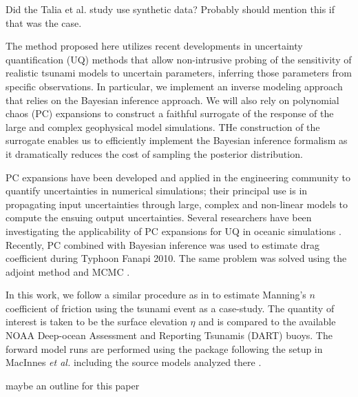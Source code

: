\alert{Did the Talia et al. study use synthetic data?  Probably should mention
this if that was the case.}

The method proposed here utilizes recent developments in uncertainty
quantification (UQ) methods that allow non-intrusive probing of the sensitivity
of realistic tsunami  models to uncertain parameters, inferring those parameters
from specific  observations.  In particular, we implement an inverse modeling
approach that relies on the Bayesian inference approach.  We will also rely on
polynomial chaos (PC) expansions to construct a faithful surrogate of the
response of the large and complex geophysical model simulations.  THe
construction of the surrogate enables us to efficiently implement the Bayesian
inference formalism as it dramatically reduces the cost of sampling the
posterior distribution.

PC expansions have been developed and applied in the engineering community to
quantify uncertainties in numerical simulations; their principal use is in
propagating input uncertainties through large, complex and non-linear models to
compute the ensuing output uncertainties. Several researchers have been
investigating the applicability of PC expansions for UQ in oceanic simulations
\citep{thacker2012,ashwanth2010,Alexanderian2012}. Recently, PC combined with
Bayesian inference was used to estimate drag coefficient during Typhoon Fanapi
2010. The same problem was solved using the adjoint method and MCMC
\cite{sraj:2013a,sraj:2013b}.

In this work, we follow a similar procedure as in \cite{sraj:2013a,sraj:2013b}
to estimate Manning's $n$ coefficient of friction using the \tohoku tsunami
event as a case-study.  The quantity of interest is taken to be the surface
elevation $\eta$ and is compared to the available NOAA Deep-ocean Assessment and
Reporting Tsunamis (DART) buoys.  The forward model runs are performed using the
\geoclaw package following the setup in MacInnes \emph{et al.} including the
source models analyzed there \cite{MacInnes:2013cr}.

\alert{maybe an outline for this paper}
